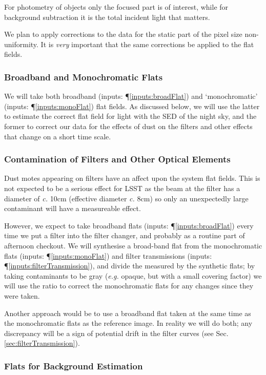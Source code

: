 \documentclass[12pt]{article}
\renewcommand{\c}{\textit{c.}\xspace}
\newcommand{\eg}{\textit{e.g.}\xspace}
\newcommand{\inputData}[1]{(inputs: \P \ref{inputs:#1})}
\newcommand{\secRef}[1]{Sec. \ref{sec:#1}}
\begin{document}
For photometry of objects only the focused part is of interest, while for background subtraction it is the
total incident light that matters.

We plan to apply corrections to the data for the static part of the pixel size non-uniformity.  It is
\textit{very} important that the same corrections be applied to the flat fields.

\subsubsection{Broadband and Monochromatic Flats}

We will take both broadband \inputData{broadFlat} and `monochromatic' \inputData{monoFlat} flat fields.
As discussed below, we will use the latter to estimate the correct flat field for light with the SED of the
night sky, and the former to correct our data for the effects of dust on the filters and other effects that
change on a short time scale.

\subsubsection{Contamination of Filters and Other Optical Elements}

Dust motes appearing on filters have an affect upon the system flat fields.  This is not expected to be
a serious effect for LSST as the beam at the filter has a diameter of \c 10cm (effective diameter \c 8cm)
so only an unexpectedly large contaminant will have a measureable effect.

However, we expect to take broadband flats \inputData{broadFlat} every time we put a filter into the filter
changer, and probably as a routine part of afternoon checkout.  We will synthesise a broad-band flat from the
monochromatic flats \inputData{monoFlat} and filter transmissions \inputData{filterTransmission}, and divide the
measured by the synthetic flats; by taking contaminants to be gray (\eg opaque, but with a small covering
factor) we will use the ratio to correct the monochromatic flats for any changes since they were taken.

Another approach would be to use a broadband flat taken at the same time as the monochromatic flats
as the reference image.  In reality we will do both;  any discrepancy will be a sign of potential
drift in the filter curves (see \secRef{filterTransmission}).

\subsubsection{Flats for Background Estimation}
\label{sec:backgroundFlats}
\end{document}
